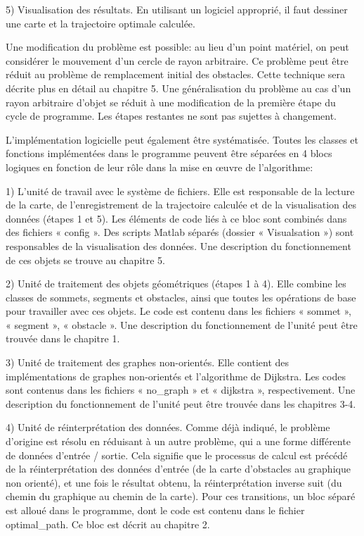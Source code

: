 \documentclass[12pt]{article}
\begin{document}
	5) Visualisation des résultats. En utilisant un logiciel approprié, il faut dessiner une carte et la trajectoire optimale calculée.
	
	Une modification du problème est possible: au lieu d'un point matériel, on peut considérer le mouvement d'un cercle de rayon arbitraire. Ce problème peut être réduit au problème de remplacement initial des obstacles. Cette technique sera décrite plus en détail au chapitre 5. Une généralisation du problème au cas d'un rayon arbitraire d’objet se réduit à une modification de la première étape du cycle de programme. Les étapes restantes ne sont pas sujettes à changement.
	
	L'implémentation logicielle peut également être systématisée. Toutes les classes et fonctions implémentées dans le programme peuvent être séparées en 4 blocs logiques en fonction de leur rôle dans la mise en œuvre de l'algorithme:
	
	1) L'unité de travail avec le système de fichiers. Elle est responsable de la lecture de la carte, de l'enregistrement de la trajectoire calculée et de la visualisation des données (étapes 1 et 5). Les éléments de code liés à ce bloc sont combinés dans des fichiers « config ». Des scripts Matlab séparés (dossier « Visualsation ») sont responsables de la visualisation des données. Une description du fonctionnement de ces objets se trouve au chapitre 5.
	
	2) Unité de traitement des objets géométriques (étapes 1 à 4). Elle combine les classes de sommets, segments et obstacles, ainsi que toutes les opérations de base pour travailler avec ces objets. Le code est contenu dans les fichiers  « sommet », « segment », « obstacle ». Une description du fonctionnement de l'unité peut être trouvée dans le chapitre 1.
	
	3) Unité de traitement des graphes non-orientés. Elle contient des implémentations de graphes non-orientés et l'algorithme de Dijkstra. Les codes sont contenus dans les fichiers « no\_graph » et « dijkstra », respectivement. Une description du fonctionnement de l'unité peut être trouvée dans les chapitres 3-4.
	
	4) Unité de réinterprétation des données. Comme déjà indiqué, le problème d'origine est résolu en réduisant à un autre problème, qui a une forme différente de données d'entrée / sortie. Cela signifie que le processus de calcul est précédé de la réinterprétation des données d'entrée (de la carte d'obstacles au graphique non orienté), et une fois le résultat obtenu, la réinterprétation inverse suit (du chemin du graphique au chemin de la carte). Pour ces transitions, un bloc séparé est alloué dans le programme, dont le code est contenu dans le fichier optimal\_path. Ce bloc est décrit au chapitre 2.
	
\end{document}
